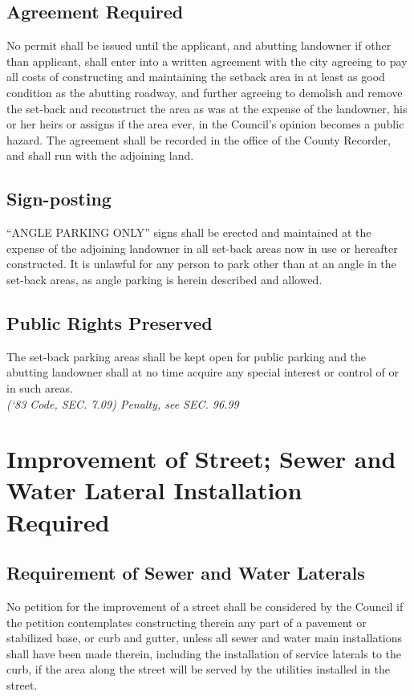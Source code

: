 \subsection{Agreement Required}
No permit shall be issued until the applicant, and abutting landowner if other than applicant, shall enter into a written agreement with the city agreeing to pay all costs of constructing and maintaining the setback area in at least as good condition as the abutting roadway, and further agreeing to demolish and remove the set-back and reconstruct the area as was at the expense of the landowner, his or her heirs or assigns if the area ever, in the Council’s opinion becomes a public hazard.  The agreement shall be recorded in the office of the County Recorder, and shall run with the adjoining land.
\subsection{Sign-posting}
“ANGLE PARKING ONLY” signs shall be erected and maintained at the expense of the adjoining landowner in all set-back areas now in use or hereafter constructed.  It is unlawful for any person to park other than at an angle in the set-back areas, as angle parking is herein described and allowed.
\subsection{Public Rights Preserved}
The set-back parking areas shall be kept open for public parking and the abutting landowner shall at no time acquire any special interest or control of or in such areas.\\
\emph{(‘83 Code, SEC. 7.09)  Penalty, see SEC. 96.99}
\section{Improvement of Street; Sewer and Water Lateral Installation Required}
\subsection{Requirement of Sewer and Water Laterals}
No petition for the improvement of a street shall be considered by the Council if the petition contemplates constructing therein any part of a pavement or stabilized base, or curb and gutter, unless all sewer and water main installations shall have been made therein, including the installation of service laterals to the curb, if the area along the street will be served by the utilities installed in the street.
